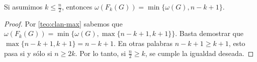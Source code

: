     \begin{corolario}
        Si asumimos $k \leq \frac{n}{2}$, entonces $\omega(F_k(G))= \min
        \{\omega(G), n-k+1\}$.
    \end{corolario}

    \begin{proof}
        Por \cref{teo:clan-max} sabemos que $\omega(F_k(G))= \min
        \{\omega(G), \max \{n-k+1,k+1\}\}$. Basta demostrar que $\max \{n-k+1,
        k+1\} = n-k+1$. En otras palabras $n-k+1 \geq k+1$, esto pasa si y
        s\'olo si $n \geq 2k$. Por lo tanto, si $\frac{n}{2} \geq k$, se cumple
        la igualdad deseada.
    \end{proof}